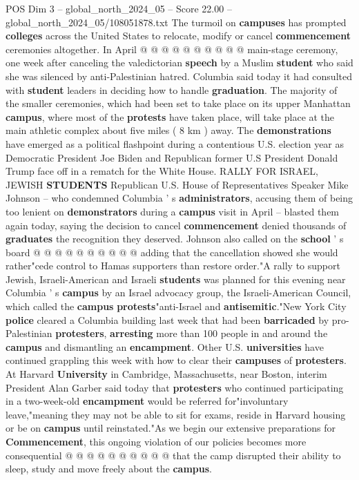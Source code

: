 \begin{textsample}{POS Dim 3 – global\_north\_2024\_05 – Score 22.00 – global\_north\_2024\_05/108051878.txt}
The turmoil on \textbf{campuses} has prompted \textbf{colleges} across the United States to relocate, modify or cancel \textbf{commencement} ceremonies altogether.
In April @ @ @ @ @ @ @ @ @ @ main-stage ceremony, one week after canceling the valedictorian \textbf{speech} by a Muslim \textbf{student} who said she was silenced by anti-Palestinian hatred.
Columbia said today it had consulted with \textbf{student} leaders in deciding how to handle \textbf{graduation}.
The majority of the smaller ceremonies, which had been set to take place on its upper Manhattan \textbf{campus}, where most of the \textbf{protests} have taken place, will take place at the main athletic complex about five miles ( 8 km ) away.
The \textbf{demonstrations} have emerged as a political flashpoint during a contentious U.S. election year as Democratic President Joe Biden and Republican former U.S President Donald Trump face off in a rematch for the White House.
RALLY FOR ISRAEL, JEWISH \textbf{STUDENTS} Republican U.S.
House of Representatives Speaker Mike Johnson -- who condemned Columbia ' s \textbf{administrators}, accusing them of being too lenient on \textbf{demonstrators} during a \textbf{campus} visit in April -- blasted them again today, saying the decision to cancel \textbf{commencement} denied thousands of \textbf{graduates} the recognition they deserved.
Johnson also called on the \textbf{school} ' s board @ @ @ @ @ @ @ @ @ @ adding that the cancellation showed she would rather"cede control to Hamas supporters than restore order."A rally to support Jewish, Israeli-American and Israeli \textbf{students} was planned for this evening near Columbia ' s \textbf{campus} by an Israel advocacy group, the Israeli-American Council, which called the \textbf{campus} \textbf{protests}"anti-Israel and \textbf{antisemitic}."New York City \textbf{police} cleared a Columbia building last week that had been \textbf{barricaded} by pro-Palestinian \textbf{protesters}, \textbf{arresting} more than 100 people in and around the \textbf{campus} and dismantling an \textbf{encampment}.
Other U.S. \textbf{universities} have continued grappling this week with how to clear their \textbf{campuses} of \textbf{protesters}.
At Harvard \textbf{University} in Cambridge, Massachusetts, near Boston, interim President Alan Garber said today that \textbf{protesters} who continued participating in a two-week-old \textbf{encampment} would be referred for"involuntary leave,"meaning they may not be able to sit for exams, reside in Harvard housing or be on \textbf{campus} until reinstated."As we begin our extensive preparations for \textbf{Commencement}, this ongoing violation of our policies becomes more consequential @ @ @ @ @ @ @ @ @ @ that the camp disrupted their ability to sleep, study and move freely about the \textbf{campus}.

\end{textsample}
